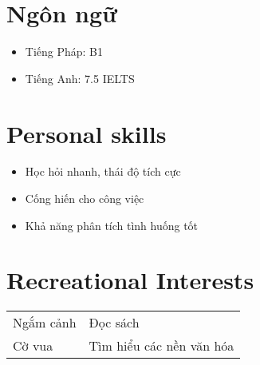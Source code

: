 \documentclass[a4paper,11pt]{article}
\newcommand{\resumeHeadingSkillStart}{\begin{itemize}[leftmargin=*,itemsep=1.7mm, rightmargin=2ex]}
\newcommand{\resumeHeadingSkillEnd}{\end{itemize}\vspace{-2mm}}
\begin{document}
\section{\textbf{Ngôn ngữ}}
\resumeHeadingSkillStart
	\item Tiếng Pháp: B1
	\vspace{-2mm}


	\item Tiếng Anh: 7.5 IELTS
	\vspace{-2mm}

\resumeHeadingSkillEnd

\section{\textbf{Personal skills}}
\resumeHeadingSkillStart
	\item Học hỏi nhanh, thái độ tích cực 
	\vspace{-2mm}


	\item Cống hiến cho công việc 
	\vspace{-2mm}


	\item Khả năng phân tích tình huống tốt 
	\vspace{-1mm}

\resumeHeadingSkillEnd
\vspace{-1.5mm}


\section{\textbf{Recreational Interests}}
\begin{table}[h]
	\begin{tabularx}{\textwidth} {X  X}
		Ngắm cảnh  
		& Đọc sách
		\\
		
		Cờ vua 
		& Tìm hiểu các nền văn hóa  
		
	\end{tabularx}
\end{table}


\vspace{-1.5mm}

\vfill
\end{document}
